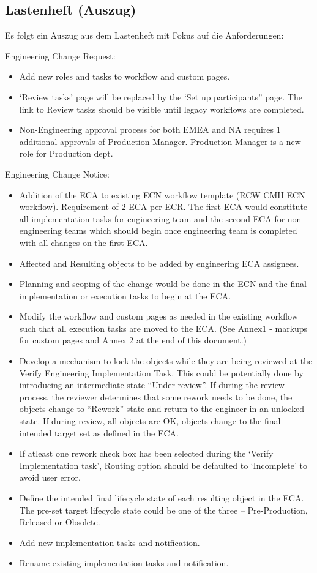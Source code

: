 \subsection{Lastenheft (Auszug)}
\label{app:Lastenheft}
Es folgt ein Auszug aus dem Lastenheft mit Fokus auf die Anforderungen:

Engineering Change Request:
\begin{itemize}
	\item Add new roles and tasks to workflow and custom pages.
	\item ‘Review tasks’ page will be replaced by the ‘Set up participants” page. The link to Review tasks should be visible until legacy workflows are completed.
	\item Non-Engineering approval process for both EMEA and NA requires 1 additional approvals of Production Manager. Production Manager is a new role for Production dept.
\end{itemize}

Engineering Change Notice:
\begin{itemize}
	\item Addition of the ECA to existing ECN workflow template (RCW CMII ECN workflow). Requirement of 2 ECA per ECR. The first ECA would constitute all implementation tasks for engineering team and the second ECA for non -engineering teams which should begin once engineering team is completed with all changes on the first ECA.
	\item Affected and Resulting objects to be added by engineering ECA assignees.
	\item Planning and scoping of the change would be done in the ECN and the final implementation or execution tasks to begin at the ECA.
	\item Modify the workflow and custom pages as needed in the existing workflow such that all execution tasks are moved to the ECA. (See Annex1 - markups for custom pages and Annex 2 at the end of this document.)
	\item Develop a mechanism to lock the objects while they are being reviewed at the Verify Engineering Implementation Task. This could be potentially done by introducing an intermediate state “Under review”. If during the review process, the reviewer determines that some rework needs to be done, the objects change to “Rework” state and return to the engineer in an unlocked state. If during review, all objects are OK, objects change to the final intended target set as defined in the ECA.
	\item If atleast one rework check box has been selected during the ‘Verify Implementation task’, Routing option should be defaulted to ‘Incomplete’ to avoid user error.
	\item Define the intended final lifecycle state of each resulting object in the ECA. The pre-set target lifecycle state could be one of the three – Pre-Production, Released or Obsolete.
	\item Add new implementation tasks and notification.
	\item Rename existing implementation tasks and notification.
\end{itemize}
